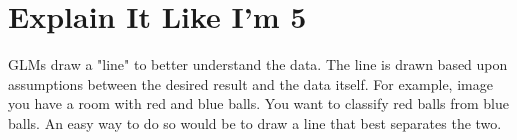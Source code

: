 \documentclass{article}
\begin{document}
\section{Explain It Like I'm 5}

GLMs draw a "line" to better understand the data. The line is drawn based upon assumptions between the desired result and the data itself. 
For example, image you have a room with red and blue balls. You want to classify red balls from blue balls. An easy way to do so would be to draw a line that 
best separates the two. 
\end{document}
